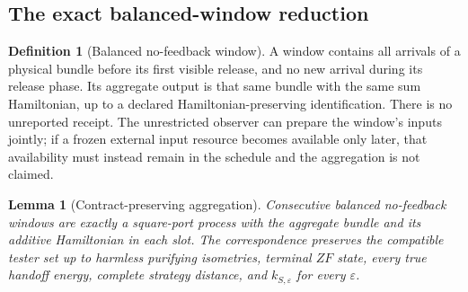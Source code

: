\documentclass[11pt]{article}
\newtheorem{lemma}[theorem]{Lemma}
\theoremstyle{definition}
\newtheorem{definition}{Definition}
\theoremstyle{remark}
\providecommand{\eps}{\varepsilon}
\begin{document}
\subsection{The exact balanced-window reduction}
\begin{definition}[Balanced no-feedback window]
A window contains all arrivals of a physical bundle before its first visible release, and no new arrival during its release phase. Its aggregate output is that same bundle with the same sum Hamiltonian, up to a declared Hamiltonian-preserving identification. There is no unreported receipt. The unrestricted observer can prepare the window's inputs jointly; if a frozen external input resource becomes available only later, that availability must instead remain in the schedule and the aggregation is not claimed.
\end{definition}
\begin{lemma}[Contract-preserving aggregation]\label{sc-lem:windows}
Consecutive balanced no-feedback windows are exactly a square-port process with the aggregate bundle and its additive Hamiltonian in each slot. The correspondence preserves the compatible tester set up to harmless purifying isometries, terminal $ZF$ state, every true handoff energy, complete strategy distance, and $k_{S,\eps}$ for every $\eps$.
\end{lemma}
\end{document}
